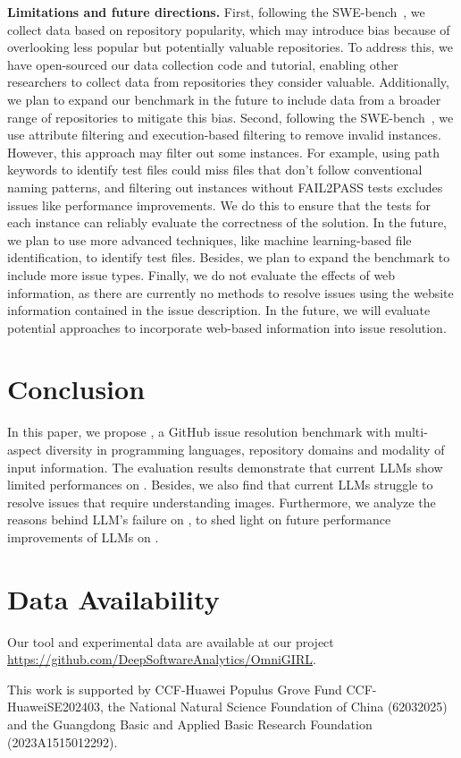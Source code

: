 \textbf{Limitations and future directions.} First, following the SWE-bench~\cite{jimenez2023swe}, we collect data based on repository popularity, which may introduce bias because of overlooking less popular but potentially valuable repositories. To address this, we have open-sourced our data collection code and tutorial, enabling other researchers to collect data from repositories they consider valuable. Additionally, we plan to expand our benchmark in the future to include data from a broader range of repositories to mitigate this bias. Second, following the SWE-bench~\cite{jimenez2023swe}, we use attribute filtering and execution-based filtering to remove invalid instances. However, this approach may filter out some instances. For example, using path keywords to identify test files could miss files that don't follow conventional naming patterns, and filtering out instances without FAIL2PASS tests excludes issues like performance improvements. We do this to ensure that the tests for each instance can reliably evaluate the correctness of the solution. In the future, we plan to use more advanced techniques, like machine learning-based file identification, to identify test files. Besides, we plan to expand the benchmark to include more issue types. Finally, we do not evaluate the effects of web information, as there are currently no methods to resolve issues using the website information contained in the issue description. In the future, we will evaluate potential approaches to incorporate web-based information into issue resolution.

\secmargin

\section{Conclusion}
In this paper, we propose \Swebenchx, a GitHub issue resolution benchmark with multi-aspect
diversity in programming languages, repository domains and modality of input information. The evaluation results demonstrate that current LLMs show limited performances on \Swebenchx. Besides, we also find that current LLMs struggle to resolve issues that require understanding images. Furthermore, we analyze the reasons behind LLM's failure on \Swebenchx, to shed light on future performance improvements of LLMs on \Swebenchx. 


\secmargin
\section{Data Availability}
\label{sec:open-science}
Our tool and experimental data are available at our project \url{https://github.com/DeepSoftwareAnalytics/OmniGIRL}.

\sloppy
\begin{acks}
This work is supported by CCF-Huawei Populus Grove Fund CCF-HuaweiSE202403, the National Natural Science Foundation of China (62032025) and the Guangdong Basic and Applied Basic Research Foundation (2023A1515012292).
\end{acks}


